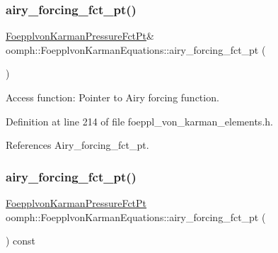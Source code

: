 \subsubsection{\texorpdfstring{airy\+\_\+forcing\+\_\+fct\+\_\+pt()}{airy\_forcing\_fct\_pt()}\hspace{0.1cm}{\footnotesize\ttfamily [1/2]}}
{\footnotesize\ttfamily \hyperlink{classoomph_1_1FoepplvonKarmanEquations_a39b64f9712ec34f455beb9f4271ff297}{Foepplvon\+Karman\+Pressure\+Fct\+Pt}\& oomph\+::\+Foepplvon\+Karman\+Equations\+::airy\+\_\+forcing\+\_\+fct\+\_\+pt (\begin{DoxyParamCaption}{ }\end{DoxyParamCaption})\hspace{0.3cm}{\ttfamily [inline]}}



Access function\+: Pointer to Airy forcing function. 



Definition at line 214 of file foeppl\+\_\+von\+\_\+karman\+\_\+elements.\+h.



References Airy\+\_\+forcing\+\_\+fct\+\_\+pt.

\mbox{\label{classoomph_1_1FoepplvonKarmanEquations_a35fc7a18b13fb4a2ff5290bd511f7fac}} 
\subsubsection{\texorpdfstring{airy\+\_\+forcing\+\_\+fct\+\_\+pt()}{airy\_forcing\_fct\_pt()}\hspace{0.1cm}{\footnotesize\ttfamily [2/2]}}
{\footnotesize\ttfamily \hyperlink{classoomph_1_1FoepplvonKarmanEquations_a39b64f9712ec34f455beb9f4271ff297}{Foepplvon\+Karman\+Pressure\+Fct\+Pt} oomph\+::\+Foepplvon\+Karman\+Equations\+::airy\+\_\+forcing\+\_\+fct\+\_\+pt (\begin{DoxyParamCaption}{ }\end{DoxyParamCaption}) const\hspace{0.3cm}{\ttfamily [inline]}}



